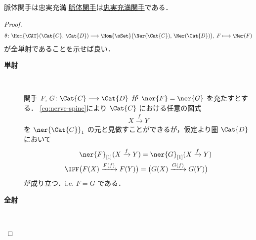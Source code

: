 \documentclass[TQFT_main]{subfiles}
\begin{document}
\begin{myprop}[label=prop:nerve]{脈体関手は忠実充満}
    \hyperref[def:nerve]{脈体関手}は\hyperref[def:faithful]{忠実充満関手}である．
\end{myprop}
\begin{proof}
    \begin{align}
        \theta \colon \Hom{\CAT}(\Cat{C},\, \Cat{D}) \lto \Hom{\sSet} \bigl( \Ner (\Cat{C}),\, \Ner (\Cat{D}) \bigr),\; F \lmto \Ner (F)
    \end{align}
    が全単射であることを示せば良い．

    \begin{description}
        \item[\textbf{単射}]　
        
        関手 $F,\, G \colon \Cat{C} \lto \Cat{D}$ が $\ner{F} = \ner{G}$ を充たすとする．
        \eqref{eq:nerve-spine}により $\Cat{C}$ における任意の図式
        \begin{align}
            X \xrightarrow{f} Y
        \end{align}
        を $\ner{\Cat{C}}_1$ の元と見做すことができるが，仮定より圏 $\Cat{D}$ において
        \begin{align}
            &\ner{F}_{[1]}(X \xrightarrow{f} Y) = \ner{G}_{[1]}(X \xrightarrow{f} Y) \\
            \IFF & \bigl(F(X) \xrightarrow{F(f)} F(Y)\bigr) =  \bigl(G(X) \xrightarrow{G(f)} G(Y)\bigr)
        \end{align}
        が成り立つ．i.e. $F = G$ である．
        \item[\textbf{全射}]　
        

\end{description}
\end{proof}
\end{document}
